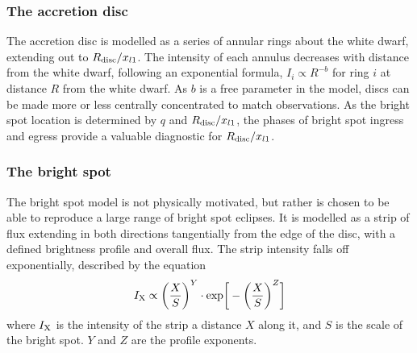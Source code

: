 \subsubsection{The accretion disc}
The accretion disc is modelled as a series of annular rings about the white dwarf, extending out to $R_{\rm disc} / x_{l1}$. The intensity of each annulus decreases with distance from the white dwarf, following an exponential formula, $I_i \propto R^{-b}$ for ring $i$ at distance $R$ from the white dwarf. As $b$ is a free parameter in the model, discs can be made more or less centrally concentrated to match observations. As the bright spot location is determined by $q$ and $R_{\rm disc} / x_{l1}$, the phases of bright spot ingress and egress provide a valuable diagnostic for $R_{\rm disc} / x_{l1}$.

\subsubsection{The bright spot}
The bright spot model is not physically motivated, but rather is chosen to be able to reproduce a large range of bright spot eclipses. 
It is modelled as a strip of flux extending in both directions tangentially from the edge of the disc, with a defined brightness profile and overall flux. The strip intensity falls off exponentially, described by the equation
\begin{equation}
    I_{\rm X} \propto \bigg ( \frac{X}{S} \bigg )^Y \cdot {\rm exp} \bigg [ - \bigg (\frac{X}{S} \bigg )^Z \bigg]    
\end{equation}
where $I_{\rm X}$ is the intensity of the strip a distance $X$ along it, and $S$ is the scale of the bright spot. $Y$ and $Z$ are the profile exponents. 

